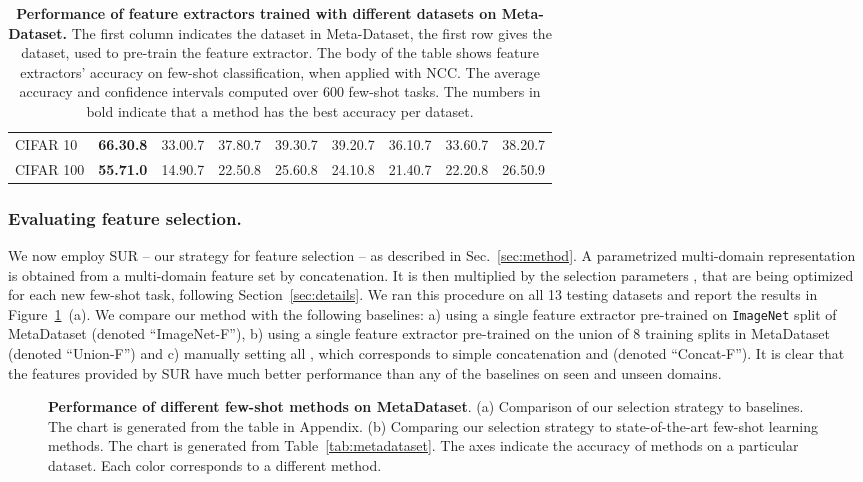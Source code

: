 \documentclass[runningheads]{llncs}
\newcommand\bb[1]{\textbf{#1}}
\newcommand{\pms}[1]{{\scriptsize #1}}
\begin{document}
\begin{table}[t!]
\begin{center}
{\begin{tabular}{l| c c c c c c c c }
CIFAR 10     & \bb{66.3\pms{0.8}} & 33.0\pms{0.7} & 37.8\pms{0.7} & 39.3\pms{0.7} & 39.2\pms{0.7} & 36.1\pms{0.7} & 33.6\pms{0.7} & 38.2\pms{0.7} \\
CIFAR 100    & \bb{55.7\pms{1.0}} & 14.9\pms{0.7} & 22.5\pms{0.8} & 25.6\pms{0.8} & 24.1\pms{0.8} & 21.4\pms{0.7} & 22.2\pms{0.8} & 26.5\pms{0.9} \\
\hline
\end{tabular}
}
\end{center}
\caption{\bb{Performance of feature extractors trained with different datasets
  on Meta-Dataset.} The first column indicates the dataset in Meta-Dataset,
  the first row gives the dataset, used to pre-train the feature
  extractor. The body of the table shows feature extractors' accuracy on
  few-shot classification, when applied with NCC. The average accuracy and 
  confidence intervals computed over 600 few-shot tasks. The numbers in bold
  indicate that a method has the best accuracy per dataset.}
\label{tab:feature_results}
\end{table}


\subsubsection{Evaluating feature selection.} We now employ SUR -- our strategy for
feature selection -- as described in Sec.~\ref{sec:method}.
A parametrized multi-domain representation is obtained from a multi-domain feature set
by concatenation. It is then multiplied by the selection parameters
, that are being optimized for each new few-shot task, following
Section~\ref{sec:details}.
We ran this procedure on all 13 testing datasets and report the results in
Figure~\ref{fig:radars}~(a). We compare our method with the
following baselines: a) using a single feature extractor pre-trained on
\texttt{ImageNet} split of MetaDataset (denoted ``ImageNet-F''), b) using a single feature
extractor pre-trained on the union of 8 training splits in MetaDataset (denoted
``Union-F'') and c)
manually setting all , which corresponds to simple concatenation
and (denoted ``Concat-F'').
It is clear that the features provided by SUR have much better
performance than any of the baselines on seen and unseen domains.

\begin{figure}[t!]
\centering
\caption{\bb{Performance of different few-shot methods on MetaDataset}.
    (a) Comparison of our selection strategy to baselines. The chart is
    generated from the table in Appendix. (b) Comparing our selection strategy to
    state-of-the-art few-shot learning methods. The chart is generated from
    Table~\ref{tab:metadataset}. The axes indicate the accuracy of methods on a
    particular dataset. Each color corresponds to a different
    method.}
\label{fig:radars}
\end{figure}
\end{document}
